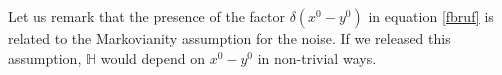 \documentclass[a4paper, amsfonts, amssymb, amsmath, reprint, showkeys, nofootinbib, twoside,notitlepage,onecolumn]{revtex4-2}
\newcommand{\Ma}{{\mathbb{M}}}
\newcommand{\Ga}{{\mathbb{G}}}
\newcommand{\Ka}{{\mathbb{K}}}
\newcommand{\Ha}{{\mathbb{H}}}
\theoremstyle{definition}
\begin{document}
Let us remark that the presence of the factor $\delta(x^0{-}y^0)$ in equation \eqref{fbruf} is related to the Markovianity assumption for the noise. If we released this assumption, $\Ha$ would depend on $x^0{-}y^0$ in non-trivial ways.




\end{document}
